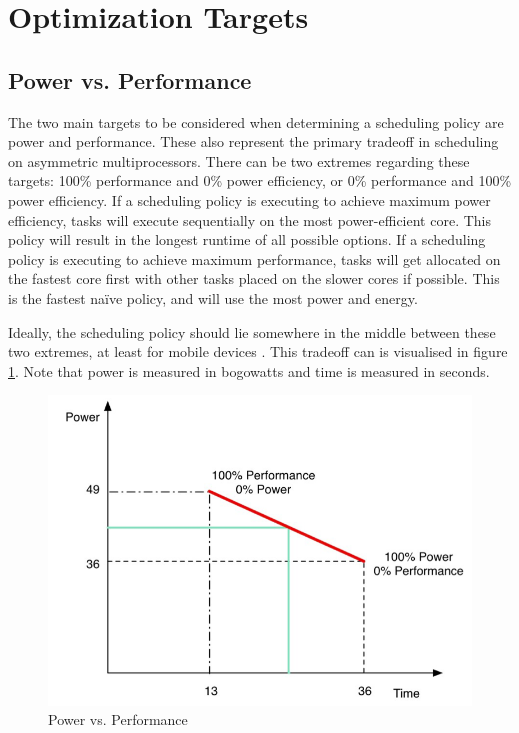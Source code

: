 \section{Optimization Targets}
\subsection{Power vs. Performance}
The two main targets to be considered when determining a scheduling policy are power and performance.
These also represent the primary tradeoff in scheduling on asymmetric multiprocessors.
There can be two extremes regarding these targets: 100\% performance and 0\% power efficiency, or 0\% performance and 100\% power efficiency.
If a scheduling policy is executing to achieve maximum power efficiency, tasks will execute sequentially on the most power-efficient core.
This policy will result in the longest runtime of all possible options.
If a scheduling policy is executing to achieve maximum performance, tasks will get allocated on the fastest core first with other tasks placed on the slower cores if possible.
This is the fastest na\"ive policy, and will use the most power and energy. \cite{AAP2013}

Ideally, the scheduling policy should lie somewhere in the middle between these two extremes, at least for mobile devices \cite{AAP2013}.
This tradeoff can is visualised in figure \ref{fig:PowerVSPerformance}.
Note that power is measured in bogowatts and time is measured in seconds.
\begin{figure}[h]
	\includegraphics[width=\textwidth]{images/power_vs_performance.jpg}
	\caption{Power vs. Performance \cite{AAP2013}}
	\label{fig:PowerVSPerformance}
\end{figure}